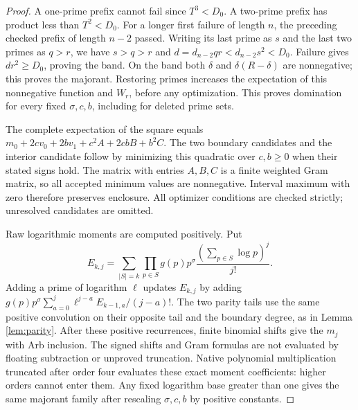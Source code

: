 \documentclass[11pt]{article}
\begin{document}
\begin{proof}
A one-prime prefix cannot fail since $T^3<D_0$.
A two-prime prefix has product less than $T^2<D_0$.
For a longer first failure of length $n$, the preceding checked
prefix of length $n-2$ passed. Writing its last prime as $s$ and
the last two primes as $q>r$, we have $s>q>r$ and
$d=d_{n-2}qr<d_{n-2}s^2<D_0$.
Failure gives $dr^2\ge D_0$, proving the band.
On the band both $\delta$ and $\delta(R-\delta)$ are nonnegative;
this proves the majorant. Restoring primes increases the expectation
of this nonnegative function and $W_r$, before any optimization.
This proves domination for every fixed $\sigma,c,b$, including for
deleted prime sets.

The complete expectation of the square equals
$m_0+2cv_0+2bv_1+c^2A+2cbB+b^2C$.
The two boundary candidates and the interior candidate follow by
minimizing this quadratic over $c,b\ge0$ when their stated signs hold.
The matrix with entries $A,B,C$ is a finite weighted Gram matrix,
so all accepted minimum values are nonnegative. Interval maximum
with zero therefore preserves enclosure. All optimizer conditions
are checked strictly; unresolved candidates are omitted.

Raw logarithmic moments are computed positively. Put
\[
E_{k,j}=\sum_{|S|=k}\prod_{p\in S}g(p)p^\sigma
\frac{(\sum_{p\in S}\log p)^j}{j!}.
\]
Adding a prime of logarithm $\ell$
updates $E_{k,j}$ by adding
$g(p)p^\sigma\sum_{a=0}^j\ell^{j-a}E_{k-1,a}/(j-a)!$.
The two parity tails use the same positive convolution on their
opposite tail and the boundary degree, as in Lemma \ref{lem:parity}.
After these positive recurrences, finite binomial shifts give the
$m_j$ with Arb inclusion. The signed shifts and Gram formulas are
not evaluated by floating subtraction or unproved truncation.
Native polynomial multiplication truncated after order four evaluates
these exact moment coefficients: higher orders cannot enter them.
Any fixed logarithm base greater than one gives the same majorant
family after rescaling $\sigma,c,b$ by positive constants.
\end{proof}
\end{document}
